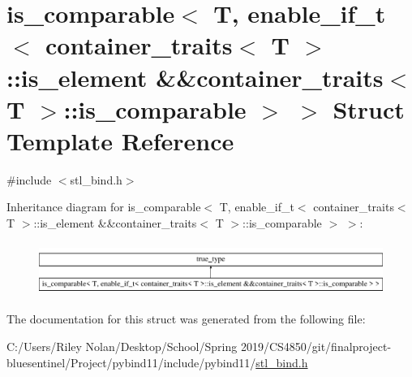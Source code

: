 \hypertarget{structis__comparable_3_01_t_00_01enable__if__t_3_01container__traits_3_01_t_01_4_1_1is__element_81dba1096c4a7c2c4f27f8f67bb7d966}{}\section{is\+\_\+comparable$<$ T, enable\+\_\+if\+\_\+t$<$ container\+\_\+traits$<$ T $>$\+::is\+\_\+element \&\&container\+\_\+traits$<$ T $>$\+::is\+\_\+comparable $>$ $>$ Struct Template Reference}
\label{structis__comparable_3_01_t_00_01enable__if__t_3_01container__traits_3_01_t_01_4_1_1is__element_81dba1096c4a7c2c4f27f8f67bb7d966}


{\ttfamily \#include $<$stl\+\_\+bind.\+h$>$}

Inheritance diagram for is\+\_\+comparable$<$ T, enable\+\_\+if\+\_\+t$<$ container\+\_\+traits$<$ T $>$\+::is\+\_\+element \&\&container\+\_\+traits$<$ T $>$\+::is\+\_\+comparable $>$ $>$\+:\begin{figure}[H]
\begin{center}
\leavevmode
\includegraphics[height=1.750000cm]{structis__comparable_3_01_t_00_01enable__if__t_3_01container__traits_3_01_t_01_4_1_1is__element_81dba1096c4a7c2c4f27f8f67bb7d966}
\end{center}
\end{figure}


The documentation for this struct was generated from the following file\+:\begin{DoxyCompactItemize}
\item 
C\+:/\+Users/\+Riley Nolan/\+Desktop/\+School/\+Spring 2019/\+C\+S4850/git/finalproject-\/bluesentinel/\+Project/pybind11/include/pybind11/\mbox{\hyperlink{stl__bind_8h}{stl\+\_\+bind.\+h}}\end{DoxyCompactItemize}
